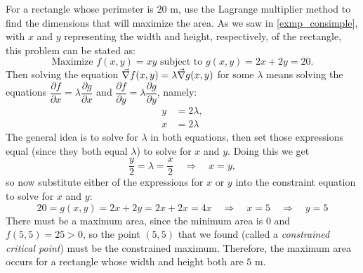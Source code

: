 \begin{example}\label{exmp_rectlm}%
For a rectangle whose perimeter is $20$ m, use the Lagrange multiplier method to find the dimensions that will maximize the area.
\solution
As we saw in \autoref{exmp_consimple}, with $x$ and $y$ representing the width and height, respectively, of the rectangle, this problem can be stated as:
 \[\text{Maximize }f(x,y) = xy\text{ subject to }g(x,y) = 2x + 2y = 20.\]
 Then solving the equation $\vec\nabla f(x,y) = \lambda \vec\nabla g(x,y)$ for some $\lambda$ means solving the equations $\dfrac{\partial f}{\partial x} = \lambda \dfrac{\partial g}{\partial x}$ and $\dfrac{\partial f}{\partial y} = \lambda \dfrac{\partial g}{\partial y}$, namely:
 \begin{align*}
  y &= 2\lambda ,\\
  x &= 2\lambda
 \end{align*}
 The general idea is to solve for $\lambda$ in both equations, then set those expressions equal (since they both equal $\lambda$) to solve for $x$ and $y$. Doing this we get
 \[\frac y2 = \lambda = \frac x2 \quad \Rightarrow \quad x = y ,\]
 so now substitute either of the expressions for $x$ or $y$ into the constraint equation to solve for $x$ and $y$:
 \[20=g(x,y)=2x+2y=2x+2x=4x\quad\Rightarrow\quad x=5\quad\Rightarrow\quad y=5\]
 There must be a maximum area, since the minimum area is $0$ and $f(5,5) = 25 > 0$, so the point $(5,5)$ that we found (called a \emph{constrained critical point}) must be the constrained maximum. Therefore, the maximum area occurs for a rectangle whose width and height both are $5$ m.
\end{example}

